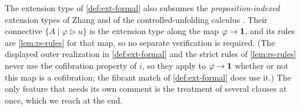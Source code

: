 \begin{remark}\label{rem:zhang-rules}
	The extension type of \cref{def:ext-formal} also subsumes the
	\emph{proposition-indexed} extension types of Zhang \citep{zhang2023three} and
	of the controlled-unfolding calculus \citep{gratzer2022controlling}. Their
	connective $\{A\mid\varphi\rhd u\}$ is the extension type along the map
	$\varphi\to\mathbf{1}$, and its rules are \cref{lem:rs-rules} for that map, so no
	separate verification is required. (The displayed outer realization in \cref{def:ext-formal}
	and the strict rules of \cref{lem:rs-rules} never use the cofibration property
	of $i$, so they apply to $\varphi\to\mathbf{1}$ whether or not this map is a
	cofibration; the fibrant match of \cref{def:ext-formal} does use it.) The only feature that needs its own
	comment is the treatment of several clauses at once, which we reach at the end.


\end{remark}
